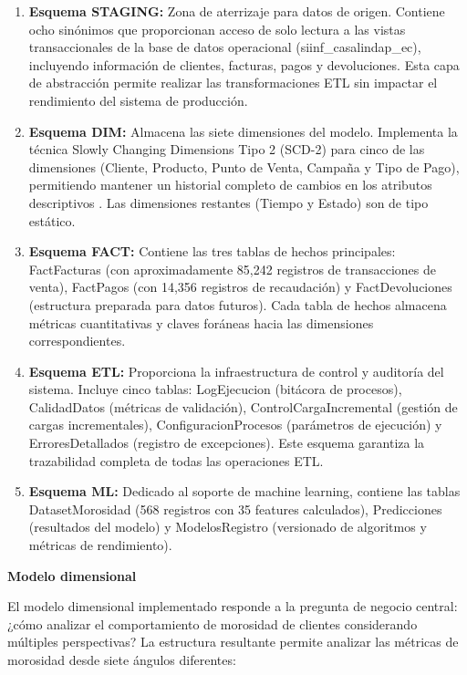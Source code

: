 \begin{enumerate}
    \item \textbf{Esquema STAGING:} Zona de aterrizaje para datos de origen. Contiene ocho sinónimos que proporcionan acceso de solo lectura a las vistas transaccionales de la base de datos operacional (siinf\_casalindap\_ec), incluyendo información de clientes, facturas, pagos y devoluciones. Esta capa de abstracción permite realizar las transformaciones ETL sin impactar el rendimiento del sistema de producción.
    
    \item \textbf{Esquema DIM:} Almacena las siete dimensiones del modelo. Implementa la técnica Slowly Changing Dimensions Tipo 2 (SCD-2) para cinco de las dimensiones (Cliente, Producto, Punto de Venta, Campaña y Tipo de Pago), permitiendo mantener un historial completo de cambios en los atributos descriptivos \cite{kimball2008scd}. Las dimensiones restantes (Tiempo y Estado) son de tipo estático.
    
    \item \textbf{Esquema FACT:} Contiene las tres tablas de hechos principales: FactFacturas (con aproximadamente 85,242 registros de transacciones de venta), FactPagos (con 14,356 registros de recaudación) y FactDevoluciones (estructura preparada para datos futuros). Cada tabla de hechos almacena métricas cuantitativas y claves foráneas hacia las dimensiones correspondientes.
    
    \item \textbf{Esquema ETL:} Proporciona la infraestructura de control y auditoría del sistema. Incluye cinco tablas: LogEjecucion (bitácora de procesos), CalidadDatos (métricas de validación), ControlCargaIncremental (gestión de cargas incrementales), ConfiguracionProcesos (parámetros de ejecución) y ErroresDetallados (registro de excepciones). Este esquema garantiza la trazabilidad completa de todas las operaciones ETL.
    
    \item \textbf{Esquema ML:} Dedicado al soporte de machine learning, contiene las tablas DatasetMorosidad (568 registros con 35 features calculados), Predicciones (resultados del modelo) y ModelosRegistro (versionado de algoritmos y métricas de rendimiento).
\end{enumerate}

\textbf{Modelo dimensional}

El modelo dimensional implementado responde a la pregunta de negocio central: ¿cómo analizar el comportamiento de morosidad de clientes considerando múltiples perspectivas? La estructura resultante permite analizar las métricas de morosidad desde siete ángulos diferentes:

